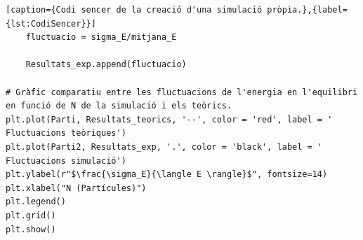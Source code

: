 \documentclass[a4paper,10.5pt]{report}
\begin{document}
\begin{appendices}
\begin{lstlisting}[caption={Codi sencer de la creació d'una simulació pròpia.},{label={lst:CodiSencer}}]
	fluctuacio = sigma_E/mitjana_E
	
	Resultats_exp.append(fluctuacio)

# Gràfic comparatiu entre les fluctuacions de l'energia en l'equilibri en funció de N de la simulació i els teòrics. 
plt.plot(Parti, Resultats_teorics, '--', color = 'red', label = ' Fluctuacions teòriques')
plt.plot(Parti2, Resultats_exp, '.', color = 'black', label = ' Fluctuacions simulació')
plt.ylabel(r"$\frac{\sigma_E}{\langle E \rangle}$", fontsize=14)
plt.xlabel("N (Partícules)")
plt.legend()
plt.grid()
plt.show()


	
	\end{lstlisting}
\end{appendices}
\end{document}
